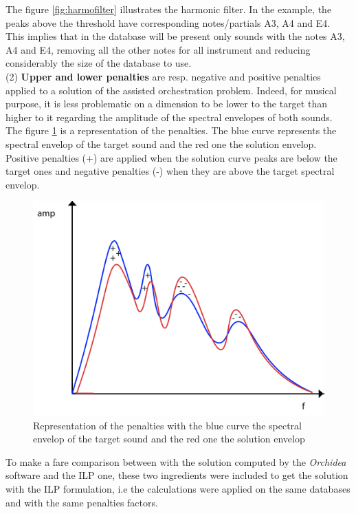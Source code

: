 \documentclass[a4paper]{book}
\begin{document}
The figure \ref{fig:harmofilter} illustrates the harmonic filter. In the example, the peaks above the threshold have corresponding notes/partials A3, A4 and E4. This implies that in the database will be present only sounds with the notes A3, A4 and E4, removing all the other notes for all instrument and reducing considerably the size of the database to use. \\


(2) \textbf{Upper and lower penalties} are resp. negative and positive penalties applied to a solution of the assisted orchestration problem. Indeed, for musical purpose, it is less problematic on a dimension to be lower to the target than higher to it regarding the amplitude of the spectral envelopes of both sounds. \\
The figure \ref{fig:penalt} is a representation of the penalties. The blue curve represents the spectral envelop of the target sound and the red one the solution envelop. Positive penalties (+) are applied when the solution curve peaks are below the target ones and negative penalties (-) when they are above the target spectral envelop. 

\begin{figure}[h!]
    \centering
    \includegraphics[scale=0.3]{penalt.png}
    \caption{Representation of the penalties with the blue curve the spectral envelop of the target sound and the red one the solution envelop}
    \label{fig:penalt}
\end{figure}

To make a fare comparison between with the solution computed by the \textit{Orchidea} software and the ILP one, these two ingredients were included to get the solution with the ILP formulation, i.e the calculations were applied on the same databases and with the same penalties factors.
\end{document}
